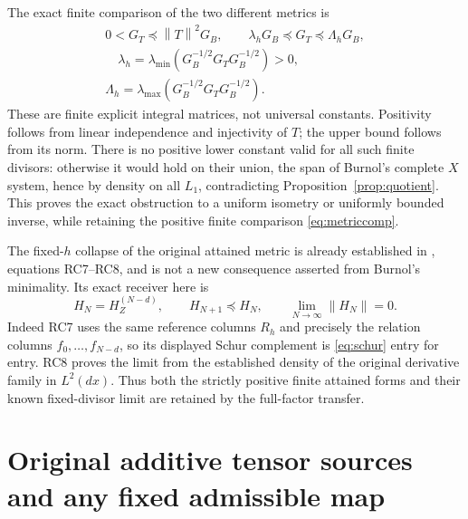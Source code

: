 \documentclass[11pt]{article}
\newcommand{\norm}[1]{\left\lVert#1\right\rVert}
\begin{document}
The exact finite comparison of the two different metrics is
\begin{equation}\label{eq:metriccomp}
 \begin{gathered}
 0<G_T\preceq\norm T^2G_B,
 \qquad \lambda_hG_B\preceq G_T\preceq\Lambda_hG_B,\\
 \quad \lambda_h=\lambda_{\min}(G_B^{-1/2}G_TG_B^{-1/2})>0,
 \\
 \Lambda_h=\lambda_{\max}(G_B^{-1/2}G_TG_B^{-1/2}).
 \end{gathered}
\end{equation}
These are finite explicit integral matrices, not universal
constants. Positivity follows from linear independence and
injectivity of $T$; the upper bound follows from its norm.
There is no positive lower constant valid for all such finite
divisors: otherwise it would hold on their union, the span
of Burnol's complete $X$ system, hence by density on all
$L_1$, contradicting Proposition~\ref{prop:quotient}.
This proves the exact obstruction to a uniform isometry or
uniformly bounded inverse, while retaining the positive
finite comparison \eqref{eq:metriccomp}.

The fixed-$h$ collapse of the original attained metric is
already established in \cite{OriginalTheta}, equations
RC7--RC8, and is not a new consequence asserted from Burnol's
minimality. Its exact receiver here is
\[
 H_N=H_Z^{(N-d)},\qquad
 H_{N+1}\preceq H_N,\qquad
 \lim_{N\to\infty}\norm{H_N}=0.
\]
Indeed RC7 uses the same reference columns $R_h$ and precisely
the relation columns $f_0,\ldots,f_{N-d}$, so its displayed
Schur complement is \eqref{eq:schur} entry for entry.
RC8 proves the limit from the established density of the
original derivative family in $L^2(dx)$. Thus both the
strictly positive finite attained forms and their known
fixed-divisor limit are retained by the full-factor transfer.

\section{Original additive tensor sources and any fixed admissible map}
\end{document}
